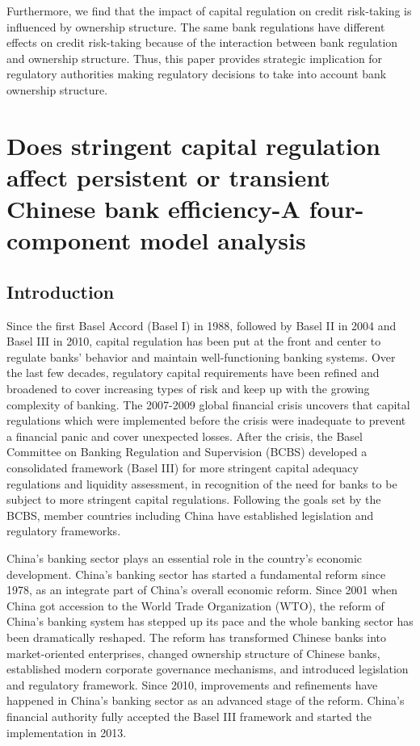 \documentclass[
  12pt,
  a4paper,
]{scrreprt}
\begin{document}
{{{{Furthermore, we find that the impact of capital regulation on credit
risk-taking is influenced by ownership structure. The same bank
regulations have different effects on credit risk-taking because of the
interaction between bank regulation and ownership structure. Thus, this
paper provides strategic implication for regulatory authorities making
regulatory decisions to take into account bank ownership structure.


\chapter{Does stringent capital regulation affect persistent or
transient Chinese bank efficiency-A four-component model
analysis}\label{does-stringent-capital-regulation-affect-persistent-or-transient-chinese-bank-efficiency-a-four-component-model-analysis}

\section{Introduction}\label{introduction-2}

Since the first Basel Accord (Basel I) in 1988, followed by Basel II in
2004 and Basel III in 2010, capital regulation has been put at the front
and center to regulate banks' behavior and maintain well-functioning
banking systems. Over the last few decades, regulatory capital
requirements have been refined and broadened to cover increasing types
of risk and keep up with the growing complexity of banking. The
2007-2009 global financial crisis uncovers that capital regulations
which were implemented before the crisis were inadequate to prevent a
financial panic and cover unexpected losses. After the crisis, the Basel
Committee on Banking Regulation and Supervision (BCBS) developed a
consolidated framework (Basel III) for more stringent capital adequacy
regulations and liquidity assessment, in recognition of the need for
banks to be subject to more stringent capital regulations. Following the
goals set by the BCBS, member countries including China have established
legislation and regulatory frameworks.

China's banking sector plays an essential role in the country's economic
development. China's banking sector has started a fundamental reform
since 1978, as an integrate part of China's overall economic reform.
Since 2001 when China got accession to the World Trade Organization
(WTO), the reform of China's banking system has stepped up its pace and
the whole banking sector has been dramatically reshaped. The reform has
transformed Chinese banks into market-oriented enterprises, changed
ownership structure of Chinese banks, established modern corporate
governance mechanisms, and introduced legislation and regulatory
framework. Since 2010, improvements and refinements have happened in
China's banking sector as an advanced stage of the reform. China's
financial authority fully accepted the Basel III framework and started
the implementation in 2013.

}}}}
\end{document}
